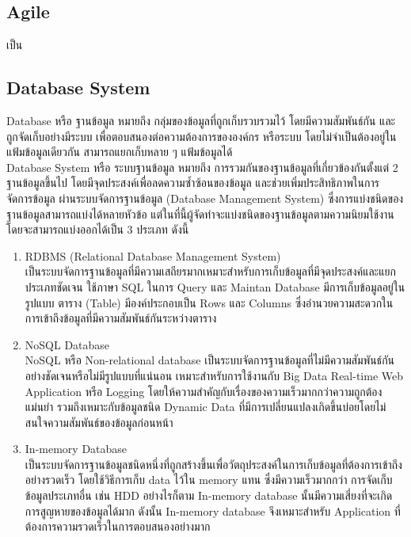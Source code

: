 \documentclass[12pt,oneside,openright,a4paper]{cpe-thai-project}
\begin{document}
\subsection{Agile}
\hspace*{1cm} เป็น


\subsection{Database System}
\hspace*{1cm} Database หรือ ฐานข้อมูล \cite{DatabaseDefinition} หมายถึง กลุ่มของข้อมูลที่ถูกเก็บรวบรวมไว้ โดยมีความสัมพันธ์กัน และถูกจัดเก็บอย่างมีระบบ เพื่อตอบสนองต่อความต้องการขององค์กร หรือระบบ โดยไม่จำเป็นต้องอยู่ในแฟ้มข้อมูลเดียวกัน สามารถแยกเก็บหลาย ๆ แฟ้มข้อมูลได้\\
\hspace*{1cm} Database System หรือ ระบบฐานข้อมูล หมายถึง การรวมกันของฐานข้อมูลที่เกี่ยวข้องกันตั้งแต่ 2 ฐานข้อมูลขึ้นไป โดยมีจุดประสงค์เพื่อลดความซ้ำซ้อนของข้อมูล และช่วยเพิ่มประสิทธิภาพในการจัดการข้อมูล ผ่านระบบจัดการฐานข้อมูล (Database Management System) ซึ่งการแบ่งชนิดของฐานข้อมูลสามารถแบ่งได้หลายหัวข้อ แต่ในที่นี้ผู้จัดทำจะแบ่งชนิดของฐานข้อมูลตามความนิยมใช้งาน โดยจะสามารถแบ่งออกได้เป็น 3 ประเภท ดังนี้
\begin{enumerate}
    \item {RDBMS (Relational Database Management System)} \cite{SqlNoSql1} \\
    \hspace*{1cm}เป็นระบบจัดการฐานข้อมูลที่มีความเสถียรมากเหมาะสำหรับการเก็บข้อมูลที่มีจุดประสงค์และแยกประเภทชัดเจน ใช้ภาษา SQL ในการ Query และ Maintan Database มีการเก็บข้อมูลอยู่ในรูปแบบ ตาราง (Table) มีองค์ประกอบเป็น Rows และ Columns ซึ่งอำนวยความสะดวกในการเข้าถึงข้อมูลที่มีความสัมพันธ์กันระหว่างตาราง
    \item {NoSQL Database} \cite{SqlNoSql1, SqlNoSql2} \\
    \hspace*{1cm}NoSQL หรือ Non-relational database เป็นระบบจัดการฐานข้อมูลที่ไม่มีความสัมพันธ์กันอย่างชัดเจนหรือไม่มีรูปแบบที่แน่นอน เหมาะสำหรับการใช้งานกับ Big Data Real-time Web Application หรือ Logging โดยให้ความสำคัญกับเรื่องของความเร็วมากกว่าความถูกต้องแม่นยำ รวมถึงเหมาะกับข้อมูลชนิด Dynamic Data ที่มีการเปลี่ยนแปลงเกิดขึ้นบ่อยโดยไม่สนใจความสัมพันธ์ของข้อมูลก่อนหน้า
    \item {In-memory Database} \cite{InmemoryDatabase} \\
    \hspace*{1cm}เป็นระบบจัดการฐานข้อมูลชนิดหนึ่งที่ถูกสร้างขึ้นเพื่อวัตถุประสงค์ในการเก็บข้อมูลที่ต้องการเข้าถึงอย่างรวดเร็ว โดยใช้วิธีการเก็บ data ไว้ใน memory แทน ซึ่งมีความเร็วมากกว่า การจัดเก็บข้อมูลประเภทอื่น เช่น HDD อย่างไรก็ตาม In-memory database นั้นมีความเสี่ยงที่จะเกิดการสูญหายของข้อมูลได้มาก ดังนั้น In-memory database จึงเหมาะสำหรับ Application ที่ต้องการความรวดเร็วในการตอบสนองอย่างมาก
\end{enumerate}
\end{document}
